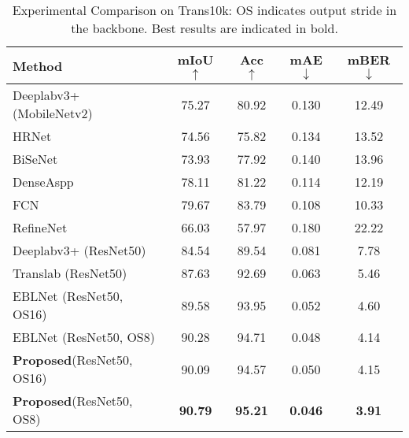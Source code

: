\documentclass[10pt,twocolumn,letterpaper]{article}
\begin{document}
\begin{table}\scriptsize
\begin{tabular}{lcccc} %
    \toprule
    Method & mIoU $\uparrow$ & Acc $\uparrow$ & mAE $\downarrow$ &mBER $\downarrow$ \\
    \midrule
    Deeplabv3+ \cite{chen2018reverse}(MobileNetv2) & 75.27 & 80.92 & 0.130 & 12.49\\
    HRNet \cite{wang2020deep}  & 74.56 & 75.82                 & 0.134 & 13.52\\
    BiSeNet \cite{yu2018bisenet}  & 73.93    & 77.92            & 0.140 & 13.96\\
    DenseAspp \cite{deng2018learning} & 78.11  & 81.22            & 0.114 & 12.19\\
    FCN \cite{long2015fully}  &79.67             & 83.79             & 0.108 & 10.33 \\
    RefineNet \cite{lin2019refinenet}  &66.03   &  57.97            & 0.180 & 22.22\\
    Deeplabv3+ \cite{chen2018reverse} (ResNet50) & 84.54 & 89.54      & 0.081 & 7.78\\
    Translab\cite{xie2020segmenting} (ResNet50)  &87.63 & 92.69     & 0.063 & 5.46\\
    EBLNet\cite{he2021enhanced} (ResNet50, OS16)  & 89.58 & 93.95     & 0.052 & 4.60\\
    EBLNet\cite{he2021enhanced} (ResNet50, OS8) & 90.28  & 94.71     & 0.048 &4.14\\
    \midrule
    \textbf{Proposed}(ResNet50, OS16)  & 90.09 & 94.57& 0.050 & 4.15\\
    \textbf{Proposed}(ResNet50, OS8)   & \textbf{90.79}  & \textbf{95.21} & \textbf{0.046} &\textbf{3.91}\\
    \bottomrule
    \end{tabular}
    \vspace*{-2mm}
    \caption{Experimental Comparison on Trans10k: OS indicates output stride in the backbone. Best results are indicated in bold.}
    \vspace*{-1mm}
    \label{tab:test}
\end{table}
\end{document}
